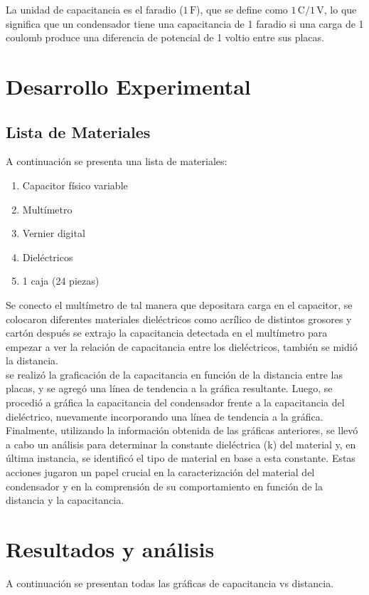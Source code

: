 \documentclass{article}
\begin{document}
\begin{multicols}{2}
La unidad de capacitancia es el faradio (\(1 \, \text{F}\)), que se define como \(1 \, \text{C} / 1 \, \text{V}\), lo que significa que un condensador tiene una capacitancia de 1 faradio si una carga de 1 coulomb produce una diferencia de potencial de 1 voltio entre sus placas.


\section{Desarrollo Experimental}\label{Desarrollo experimental}				%
\subsection*{Lista de Materiales}
A continuación se presenta una lista de materiales:

\begin{enumerate}
    \item Capacitor físico variable
    \item Multímetro
    \item Vernier digital
    \item Dieléctricos
    \item 1 caja (24 piezas)
\end{enumerate}

Se conecto el multímetro de tal manera que depositara carga en el capacitor, se colocaron
diferentes materiales dieléctricos como acrílico de distintos grosores y cartón después se
extrajo la capacitancia detectada en el multímetro para empezar a ver la relación de capacitancia    
entre los dieléctricos, también se midió la distancia.
\\
 se realizó la graficación de la capacitancia en función de la distancia entre las placas,
 y se agregó una línea de tendencia a la gráfica resultante.
 Luego, se procedió a gráfica la capacitancia del condensador 
 frente a la capacitancia del dieléctrico, nuevamente incorporando una línea de tendencia a la gráfica.
\\
 Finalmente, utilizando la información obtenida de las gráficas anteriores,
  se llevó a cabo un análisis para determinar la constante dieléctrica 
(k) del material y, en última instancia, se identificó el tipo de material en base a esta constante.
 Estas acciones jugaron un papel crucial en la caracterización del material del condensador y en la comprensión
  de su comportamiento en función de la distancia y la capacitancia.
\end{multicols}
\section{Resultados y análisis}\label{Resultados}			%
A continuación se presentan todas las gráficas de capacitancia vs distancia.
\end{document}
